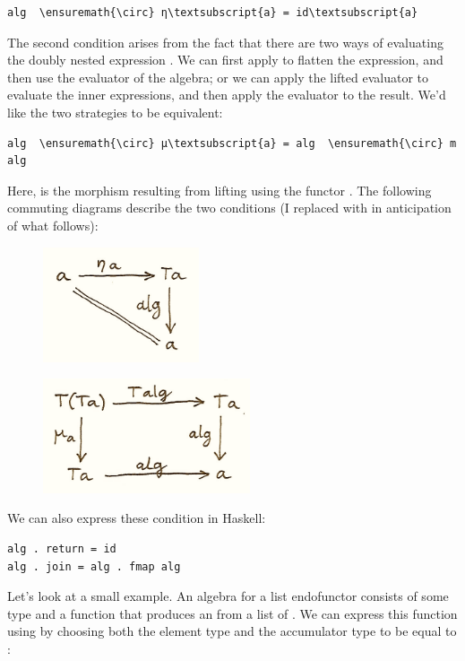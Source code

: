 \begin{Verbatim}[commandchars=\\\{\}]
alg  \ensuremath{\circ} η\textsubscript{a} = id\textsubscript{a}
\end{Verbatim}
The second condition arises from the fact that there are two ways of
evaluating the doubly nested expression . We can first
apply  to flatten the expression, and then use the evaluator
of the algebra; or we can apply the lifted evaluator to evaluate the
inner expressions, and then apply the evaluator to the result. We'd like
the two strategies to be equivalent:

\begin{Verbatim}[commandchars=\\\{\}]
alg  \ensuremath{\circ} μ\textsubscript{a} = alg  \ensuremath{\circ} m alg
\end{Verbatim}
Here,  is the morphism resulting from lifting
 using the functor . The following commuting
diagrams describe the two conditions (I replaced  with
 in anticipation of what follows):

\begin{figure}[H]
\centering
\includegraphics[width=1.81250in]{images/talg1.png}
\end{figure}

\begin{figure}[H]
\centering
\includegraphics[width=2.40625in]{images/talg2.png}
\end{figure}

\noindent
We can also express these condition in Haskell:

\begin{Verbatim}[commandchars=\\\{\}]
alg . return = id
alg . join = alg . fmap alg
\end{Verbatim}
Let's look at a small example. An algebra for a list endofunctor
consists of some type  and a function that produces an
 from a list of . We can express this function using
 by choosing both the element type and the accumulator
type to be equal to :

